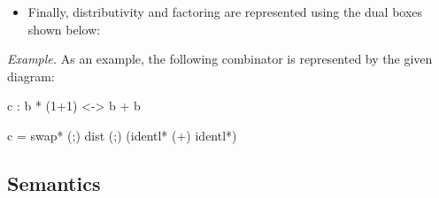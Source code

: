 \documentclass[preprint]{sigplanconf}
\begin{document}
\begin{itemize}
\item Finally, distributivity and factoring are represented using the dual
  boxes shown below:
\begin{multicols}{2}
\begin{center}
\end{center}
\begin{center}
\end{center}
\end{multicols}

\end{itemize}

\noindent 
\textit{Example.} As an example, the following combinator is represented by
the given diagram:

{{c : b * (1+1) <-> b + b}}

{{c = swap* (;) dist (;) (identl* (+) identl*)}}

\begin{center}
\end{center}

\subsection{Semantics}
\end{document}
